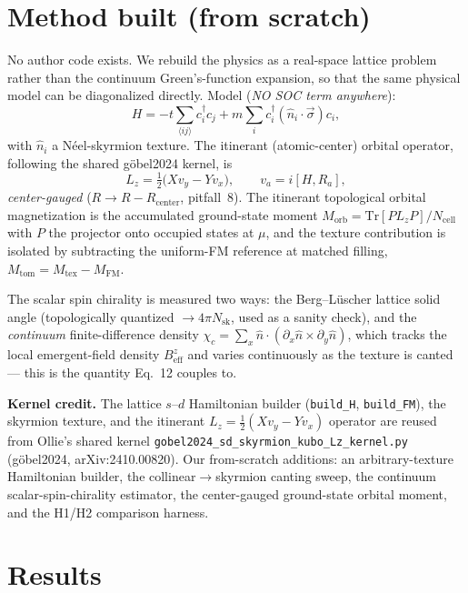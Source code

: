 \documentclass[11pt]{article}
\begin{document}
\section{Method built (from scratch)}
No author code exists. We rebuild the physics as a real-space lattice problem
rather than the continuum Green's-function expansion, so that the same physical
model can be diagonalized directly. Model (\emph{NO SOC term anywhere}):
\begin{equation}
H = -t\sum_{\langle ij\rangle} c_i^\dagger c_j
    + m\sum_i c_i^\dagger (\hat n_i\cdot\vec\sigma) c_i ,
\end{equation}
with $\hat n_i$ a N\'eel-skyrmion texture. The itinerant (atomic-center) orbital
operator, following the shared g\"obel2024 kernel, is
\begin{equation}
L_z = \tfrac12\big(X v_y - Y v_x\big),\qquad v_a=i[H,R_a],
\end{equation}
\emph{center-gauged} ($R\to R-R_{\mathrm{center}}$, pitfall~8). The itinerant
topological orbital magnetization is the accumulated ground-state moment
$M_{\mathrm{orb}}=\mathrm{Tr}[P L_z P]/N_{\mathrm{cell}}$ with $P$ the projector
onto occupied states at $\mu$, and the texture contribution is isolated by
subtracting the uniform-FM reference at matched filling,
$M_{\mathrm{tom}}=M_{\mathrm{tex}}-M_{\mathrm{FM}}$.

The scalar spin chirality is measured two ways: the Berg--L\"uscher lattice solid
angle (topologically quantized $\to 4\pi N_{\mathrm{sk}}$, used as a sanity check),
and the \emph{continuum} finite-difference density
$\chi_c=\sum_x \hat n\cdot(\partial_x\hat n\times\partial_y\hat n)$, which tracks
the local emergent-field density $B_{\mathrm{eff}}^z$ and varies continuously as
the texture is canted --- this is the quantity Eq.~12 couples to.

\textbf{Kernel credit.} The lattice $s$--$d$ Hamiltonian builder (\texttt{build\_H},
\texttt{build\_FM}), the skyrmion texture, and the itinerant $L_z=\tfrac12(Xv_y-Yv_x)$
operator are reused from Ollie's shared kernel
\texttt{gobel2024\_sd\_skyrmion\_kubo\_Lz\_kernel.py}
(g\"obel2024, arXiv:2410.00820). Our from-scratch additions: an arbitrary-texture
Hamiltonian builder, the collinear$\to$skyrmion canting sweep, the continuum
scalar-spin-chirality estimator, the center-gauged ground-state orbital moment,
and the H1/H2 comparison harness.

\section{Results}
\end{document}
